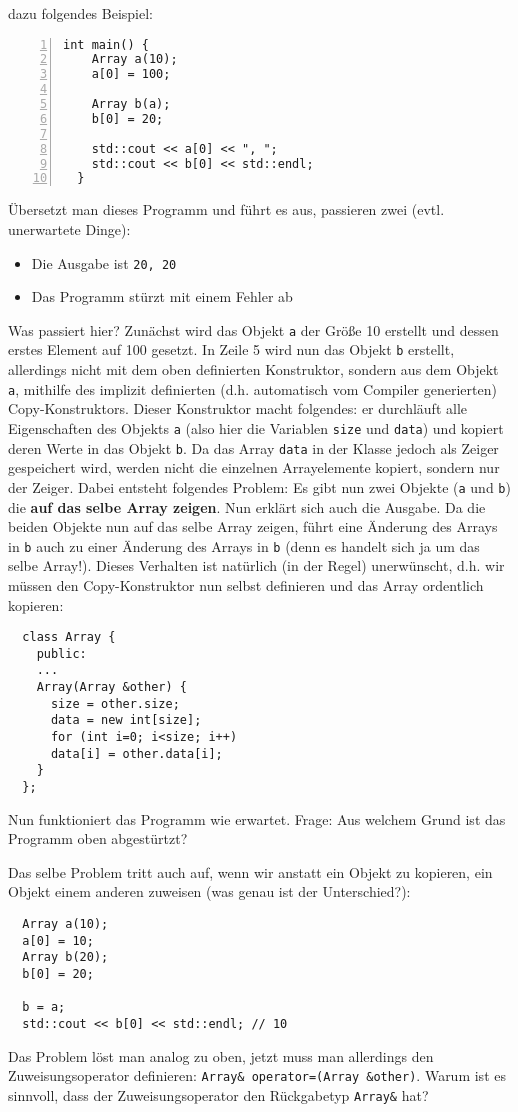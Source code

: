 \documentclass[
fontsize = 11pt,
paper    = a4,
BCOR     = 5mm,
DIV      = 12,
numbers  = noenddot,
]{scrartcl}
\def\MMS{\marginpar{%
    \vspace{-1.5em}%
    \begin{mdframed}[style=mms]%
~~???%
\end{mdframed}}}
\begin{document}
dazu folgendes Beispiel:
\begin{lstlisting}[numbers=left]
  int main() {
    Array a(10);
    a[0] = 100;

    Array b(a);
    b[0] = 20;

    std::cout << a[0] << ", ";
    std::cout << b[0] << std::endl;
  }
\end{lstlisting}
Übersetzt man dieses Programm und führt es aus, passieren zwei
(evtl. unerwartete Dinge):
\begin{itemize}
\item Die Ausgabe ist \texttt{20, 20}
\item Das Programm stürzt mit einem Fehler ab
\end{itemize}
Was passiert hier? Zunächst wird das Objekt \texttt{a} der Größe 10
erstellt und dessen erstes Element auf 100 gesetzt. In Zeile 5 wird
nun das Objekt \texttt{b} erstellt, allerdings nicht mit dem oben
definierten Konstruktor, sondern aus dem Objekt \texttt{a}, mithilfe
des implizit definierten (d.h. automatisch vom Compiler generierten)
Copy-Konstruktors. Dieser Konstruktor macht folgendes: er durchläuft
alle Eigenschaften des Objekts \texttt{a} (also hier die Variablen
\texttt{size} und \texttt{data}) und kopiert deren Werte in das Objekt
\texttt{b}. Da das Array \texttt{data} in der Klasse jedoch als Zeiger
gespeichert wird, werden nicht die einzelnen Arrayelemente kopiert,
sondern nur der Zeiger. Dabei entsteht folgendes Problem: Es gibt nun
zwei Objekte (\texttt{a} und \texttt{b}) die \textbf{auf das selbe
  Array zeigen}. Nun erklärt sich auch die Ausgabe. Da die beiden
Objekte nun auf das selbe Array zeigen, führt eine Änderung des Arrays
in \texttt{b} auch zu einer Änderung des Arrays in \texttt{b} (denn es
handelt sich ja um das selbe Array!). Dieses Verhalten ist natürlich
(in der Regel) unerwünscht, d.h. wir müssen den Copy-Konstruktor nun
selbst definieren und das Array ordentlich kopieren:
\begin{lstlisting}
  class Array {
    public:
    ...
    Array(Array &other) {
      size = other.size;
      data = new int[size];
      for (int i=0; i<size; i++)
      data[i] = other.data[i];
    }
  };  
\end{lstlisting}
Nun funktioniert das Programm wie erwartet.  Frage: Aus welchem Grund
ist das Programm oben abgestürtzt?\MMS

Das selbe Problem tritt auch auf, wenn wir anstatt ein Objekt zu
kopieren, ein Objekt einem anderen zuweisen (was genau ist der
Unterschied?\MMS):
\begin{lstlisting}
  Array a(10);
  a[0] = 10;
  Array b(20);
  b[0] = 20;
  
  b = a;
  std::cout << b[0] << std::endl; // 10
\end{lstlisting}
Das Problem löst man analog zu oben, jetzt muss man allerdings den
Zuweisungsoperator definieren: \lstinline{Array& operator=(Array &other)}.
Warum ist es sinnvoll, dass der Zuweisungsoperator den
Rückgabetyp \lstinline{Array&} hat?\MMS
\end{document}
